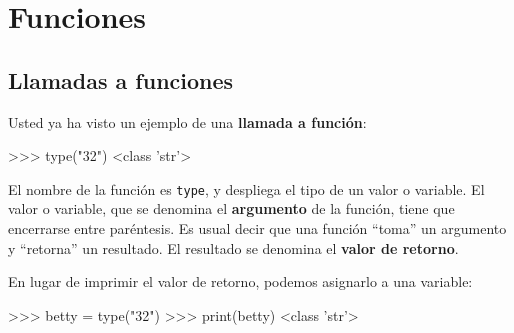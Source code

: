 


\chapter{Funciones}
\label{floatchap}

\section{Llamadas a funciones}
\label{functionchap}

Usted ya ha visto un ejemplo de una {\bf llamada a función}:

\beforeverb
\begin{pyconcode}
>>> type("32")
<class 'str'>
\end{pyconcode}
\afterverb
%

El nombre de la función es  \texttt{type}, y despliega el tipo de un 
valor o variable. El valor o variable, que se denomina el 
{\bf argumento} de la función, tiene que encerrarse entre paréntesis.
Es usual decir que una función ``toma'' un argumento y ``retorna'' un resultado.
El resultado se denomina el  {\bf valor de retorno}.


En lugar de imprimir el valor de retorno, podemos asignarlo a una variable:

\beforeverb
\begin{pyconcode}
>>> betty = type("32")
>>> print(betty)
<class 'str'>
\end{pyconcode}
\afterverb
%


